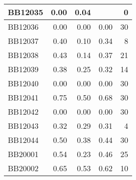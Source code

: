 \begin{longtable}{|l|r|r|r||r|}
	\hline
	BB12035 & \cellcolor[rgb]{ .384,  .745,  .478}0.00 & \cellcolor[rgb]{ .988,  1,  .992}0.04 &       & \cellcolor[rgb]{ .988,  .988,  1}0 \\
	\hline
	BB12036 & \cellcolor[rgb]{ .988,  1,  .992}0.00 & \cellcolor[rgb]{ .988,  1,  .992}0.00 & \cellcolor[rgb]{ .988,  1,  .992}0.00 & \cellcolor[rgb]{ .973,  .412,  .42}30 \\
	\hline
	BB12037 & \cellcolor[rgb]{ .988,  1,  .992}0.40 & \cellcolor[rgb]{ .384,  .745,  .478}0.10 & \cellcolor[rgb]{ .859,  .945,  .882}0.34 & \cellcolor[rgb]{ .984,  .835,  .847}8 \\
	\hline
	BB12038 & \cellcolor[rgb]{ .988,  1,  .992}0.43 & \cellcolor[rgb]{ .384,  .745,  .478}0.14 & \cellcolor[rgb]{ .871,  .949,  .894}0.37 & \cellcolor[rgb]{ .98,  .588,  .596}21 \\
	\hline
	BB12039 & \cellcolor[rgb]{ .988,  1,  .992}0.38 & \cellcolor[rgb]{ .384,  .745,  .478}0.25 & \cellcolor[rgb]{ .725,  .89,  .769}0.32 & \cellcolor[rgb]{ .984,  .722,  .729}14 \\
	\hline
	BB12040 & \cellcolor[rgb]{ .988,  1,  .992}0.00 & \cellcolor[rgb]{ .988,  1,  .992}0.00 & \cellcolor[rgb]{ .988,  1,  .992}0.00 & \cellcolor[rgb]{ .973,  .412,  .42}30 \\
	\hline
	BB12041 & \cellcolor[rgb]{ .988,  1,  .992}0.75 & \cellcolor[rgb]{ .384,  .745,  .478}0.50 & \cellcolor[rgb]{ .824,  .929,  .855}0.68 & \cellcolor[rgb]{ .973,  .412,  .42}30 \\
	\hline
	BB12042 & \cellcolor[rgb]{ .988,  1,  .992}0.00 & \cellcolor[rgb]{ .988,  1,  .992}0.00 & \cellcolor[rgb]{ .988,  1,  .992}0.00 & \cellcolor[rgb]{ .973,  .412,  .42}30 \\
	\hline
	BB12043 & \cellcolor[rgb]{ .988,  1,  .992}0.32 & \cellcolor[rgb]{ .384,  .745,  .478}0.29 & \cellcolor[rgb]{ .686,  .871,  .733}0.31 & \cellcolor[rgb]{ .988,  .914,  .925}4 \\
	\hline
	BB12044 & \cellcolor[rgb]{ .988,  1,  .992}0.50 & \cellcolor[rgb]{ .384,  .745,  .478}0.38 & \cellcolor[rgb]{ .706,  .878,  .749}0.44 & \cellcolor[rgb]{ .973,  .412,  .42}30 \\
	\hline
	BB20001 & \cellcolor[rgb]{ .988,  1,  .992}0.54 & \cellcolor[rgb]{ .384,  .745,  .478}0.23 & \cellcolor[rgb]{ .843,  .937,  .867}0.46 & \cellcolor[rgb]{ .976,  .51,  .518}25 \\
	\hline
	BB20002 & \cellcolor[rgb]{ .988,  1,  .992}0.65 & \cellcolor[rgb]{ .384,  .745,  .478}0.53 & \cellcolor[rgb]{ .835,  .933,  .863}0.62 & \cellcolor[rgb]{ .984,  .796,  .808}10 \\

\end{longtable}
